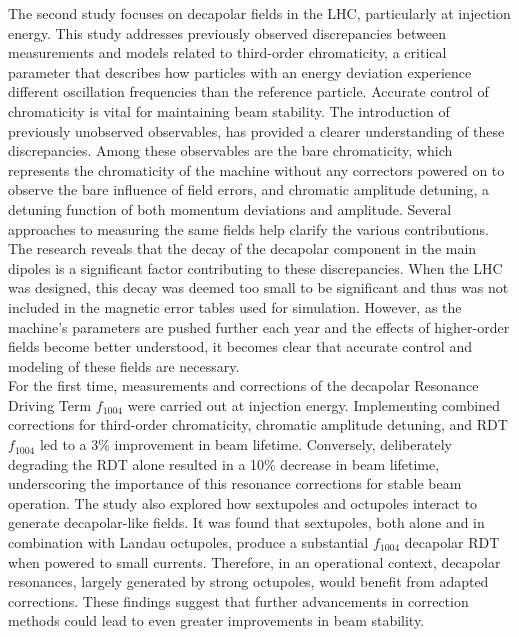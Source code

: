 {%
The second study focuses on decapolar fields in the LHC, particularly at injection energy. This
study addresses previously observed discrepancies between measurements and models related to
third-order chromaticity, a critical parameter that describes how particles with an energy deviation
experience different oscillation frequencies than the reference particle. Accurate control of
chromaticity is vital for maintaining beam stability. The introduction of previously unobserved
observables, has provided a clearer understanding of these discrepancies. Among these observables
are the bare chromaticity, which represents the chromaticity of the machine without any correctors
powered on to observe the bare influence of field errors, and chromatic amplitude detuning, a
detuning function of both momentum deviations and amplitude. Several approaches to measuring the
same fields help clarify the various contributions. The research reveals that the decay of the
decapolar component in the main dipoles is a significant factor contributing to these discrepancies.
When the LHC was designed, this decay was deemed too small to be significant and thus was not
included in the magnetic error tables used for simulation. However, as the machine's parameters are
pushed further each year and the effects of higher-order fields become better understood, it becomes
clear that accurate control and modeling of these fields are necessary.\\
\indent
For the first time, measurements and corrections of the decapolar Resonance Driving Term $f_{1004}$
were carried out at injection energy. Implementing combined corrections for third-order
chromaticity, chromatic amplitude detuning, and RDT $f_{1004}$ led to a 3\% improvement in beam
lifetime. Conversely, deliberately degrading the RDT alone resulted in a 10\% decrease in beam
lifetime, underscoring the importance of this resonance corrections for stable beam operation. The
study also explored how sextupoles and octupoles interact to generate decapolar-like fields. It was
found that sextupoles, both alone and in combination with Landau octupoles, produce a substantial
$f_{1004}$ decapolar RDT when powered to small currents. Therefore, in an operational context,
decapolar resonances, largely generated by strong octupoles, would benefit from adapted corrections.
These findings suggest that further advancements in correction methods could lead to even greater
improvements in beam stability.

}
